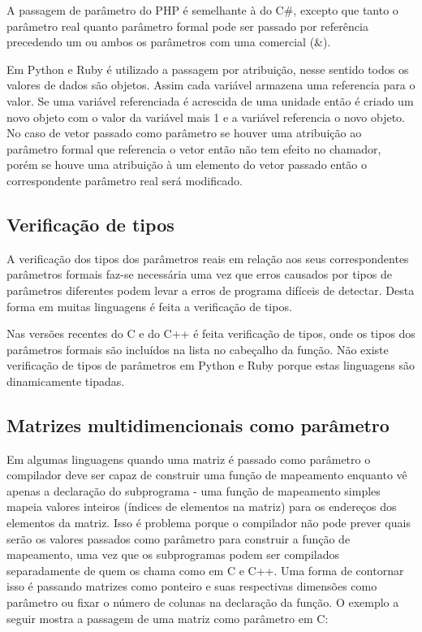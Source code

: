 A passagem de parâmetro do PHP é semelhante à do C\#, excepto que tanto o parâmetro real quanto parâmetro formal pode ser passado por referência precedendo um ou ambos os parâmetros com uma comercial (\&).

Em Python e Ruby é utilizado a passagem por atribuição, nesse sentido todos os valores de dados são objetos. Assim cada variável armazena uma referencia para o valor. Se uma variável referenciada é acrescida de uma unidade então é criado um novo objeto com o valor da variável mais 1 e a variável referencia o novo objeto. No caso de vetor passado como parâmetro se houver uma atribuição ao parâmetro formal que referencia o vetor então não tem efeito no chamador, porém se houve uma atribuição à um elemento do vetor passado então o correspondente parâmetro real será modificado.

\subsection{Verificação de tipos}
\label{sub:verificacao_de_tipos}
A verificação dos tipos dos parâmetros reais em relação aos seus correspondentes parâmetros formais faz-se necessária uma vez que erros causados por tipos de parâmetros diferentes podem levar a erros de programa difíceis de detectar. Desta forma em muitas linguagens é feita a verificação de tipos.

Nas versões recentes do C e do C++ é feita verificação de tipos, onde os tipos dos parâmetros formais são incluídos na lista no cabeçalho da função. Não existe verificação de tipos de parâmetros em Python e Ruby porque estas linguagens são dinamicamente tipadas.

\subsection{Matrizes multidimencionais como parâmetro} %
\label{sub:matrizes_multidimencionais_como_par_metro}
Em algumas linguagens quando uma matriz é passado como parâmetro o compilador deve ser capaz de construir uma função de mapeamento enquanto vê apenas a declaração do subprograma - uma função de mapeamento simples mapeia valores inteiros (índices de elementos na matriz) para os endereços dos elementos da matriz. Isso é problema porque o compilador não pode prever quais serão os valores passados como parâmetro para construir a função de mapeamento, uma vez que os subprogramas podem ser compilados separadamente de quem os chama como em C e C++. Uma forma de contornar isso é passando matrizes como ponteiro e suas respectivas dimensões como parâmetro ou fixar o número de colunas na declaração da função. O exemplo a seguir mostra a passagem de uma matriz como parâmetro em C:

